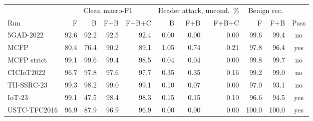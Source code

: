 \begin{tabular}{lrrrrrrrrrc}
\toprule
& \multicolumn{4}{c}{Clean macro-F1} & \multicolumn{3}{c}{Header attack, uncond.\ \%} & \multicolumn{2}{c}{Benign rec.} & \\ \cmidrule(lr){2-5}\cmidrule(lr){6-8}\cmidrule(lr){9-10}
Run & F & B & F+B & F+B+C & B & F+B & F+B+C & F & F+B & Pass \\
\midrule
5GAD-2022 & 92.6 & 92.2 & 92.5 & 92.4 & 0.00 & 0.00 & 0.00 & 99.6 & 99.4 & no \\
MCFP & 80.4 & 76.4 & 90.2 & 89.1 & 1.05 & 0.74 & 0.21 & 97.8 & 96.4 & yes \\
MCFP strict & 99.1 & 99.6 & 99.4 & 98.5 & 0.04 & 0.04 & 0.00 & 99.8 & 99.7 & no \\
CICIoT2022 & 96.7 & 97.8 & 97.6 & 97.7 & 0.35 & 0.35 & 0.16 & 99.2 & 99.0 & no \\
TII-SSRC-23 & 99.3 & 98.2 & 99.0 & 99.1 & 0.10 & 0.07 & 0.00 & 97.0 & 93.1 & no \\
IoT-23 & 99.1 & 47.5 & 98.4 & 98.3 & 0.15 & 0.15 & 0.10 & 96.6 & 94.5 & yes \\
USTC-TFC2016 & 96.9 & 87.9 & 96.9 & 96.9 & 0.00 & 0.00 & 0.00 & 100.0 & 100.0 & yes \\
\bottomrule
\end{tabular}
